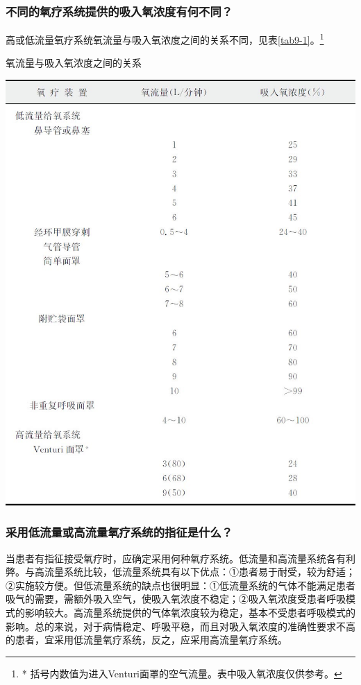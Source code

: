 \subsubsection{不同的氧疗系统提供的吸入氧浓度有何不同？}

高或低流量氧疗系统氧流量与吸入氧浓度之间的关系不同，见表\ref{tab9-1}。\footnote{* 括号内数值为进入Venturi面罩的空气流量。表中吸入氧浓度仅供参考。}

\begin{table}[htbp]
\centering
\caption{氧流量与吸入氧浓度之间的关系}
\label{tab9-1}
\includegraphics[width=\textwidth,height=\textheight,keepaspectratio]{./images/Image00070.jpg}
\end{table}



\subsubsection{采用低流量或高流量氧疗系统的指征是什么？}

当患者有指征接受氧疗时，应确定采用何种氧疗系统。低流量和高流量系统各有利弊。与高流量系统比较，低流量系统具有以下优点：①患者易于耐受，较为舒适；②实施较方便。但低流量系统的缺点也很明显：①低流量系统的气体不能满足患者吸气的需要，需额外吸入空气，使吸入氧浓度不稳定；②吸入氧浓度受患者呼吸模式的影响较大。高流量系统提供的气体氧浓度较为稳定，基本不受患者呼吸模式的影响。总的来说，对于病情稳定、呼吸平稳，而且对吸入氧浓度的准确性要求不高的患者，宜采用低流量氧疗系统，反之，应采用高流量氧疗系统。

